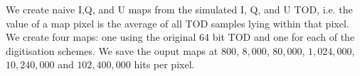 \documentclass[apj]{emulateapj}
\begin{document}
We create naive I,Q, and U maps from the simulated I, Q, and U TOD, i.e. the value of a map pixel is the average of all TOD samples lying within that pixel. We create four maps: one using the original 64 bit TOD and one for each of the digitisation schemes. We save the ouput maps at $800$, $8,000$, $80,000$, $1,024,000$, $10,240,000$ and $102,400,000$ hits per pixel.





\end{document}
